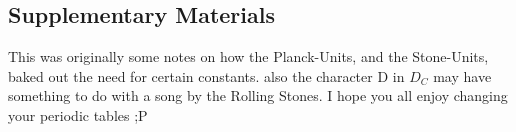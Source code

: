 \begin{multicols}{2}

%

\setcounter{table}{0}
\renewcommand{\thetable}{S\arabic{table}}%
\setcounter{figure}{0}
\renewcommand{\thefigure}{S\arabic{figure}}%
\subsection*{Supplementary Materials}
This was originally some notes on how the Planck-Units, and the Stone-Units\citep{Stoney1883}, baked out the need for certain constants. also the character D in $D_C$ may have something to do with a song by the Rolling Stones. %
I hope you all enjoy changing your periodic tables ;P
\end{multicols}


